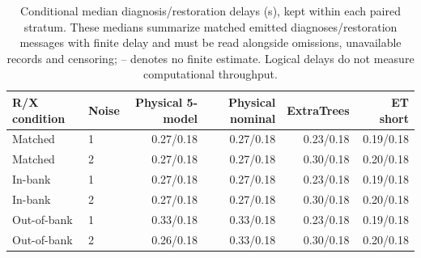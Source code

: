 \begin{table}[t]\centering\small
\caption{Conditional median diagnosis/restoration delays (s), kept within each paired stratum. These medians summarize matched emitted diagnoses/restoration messages with finite delay and must be read alongside omissions, unavailable records and censoring; -- denotes no finite estimate. Logical delays do not measure computational throughput.}
\label{tab:c01_delays}
\begin{tabular}{llrrrr}\toprule
R/X condition & Noise & Physical 5-model & Physical nominal & ExtraTrees & ET short\\\midrule
Matched & 1 & 0.27/0.18 & 0.27/0.18 & 0.23/0.18 & 0.19/0.18\\
Matched & 2 & 0.27/0.18 & 0.27/0.18 & 0.30/0.18 & 0.20/0.18\\
In-bank & 1 & 0.27/0.18 & 0.27/0.18 & 0.23/0.18 & 0.19/0.18\\
In-bank & 2 & 0.27/0.18 & 0.27/0.18 & 0.30/0.18 & 0.20/0.18\\
Out-of-bank & 1 & 0.33/0.18 & 0.33/0.18 & 0.23/0.18 & 0.19/0.18\\
Out-of-bank & 2 & 0.26/0.18 & 0.33/0.18 & 0.30/0.18 & 0.20/0.18\\
\bottomrule\end{tabular}\end{table}
